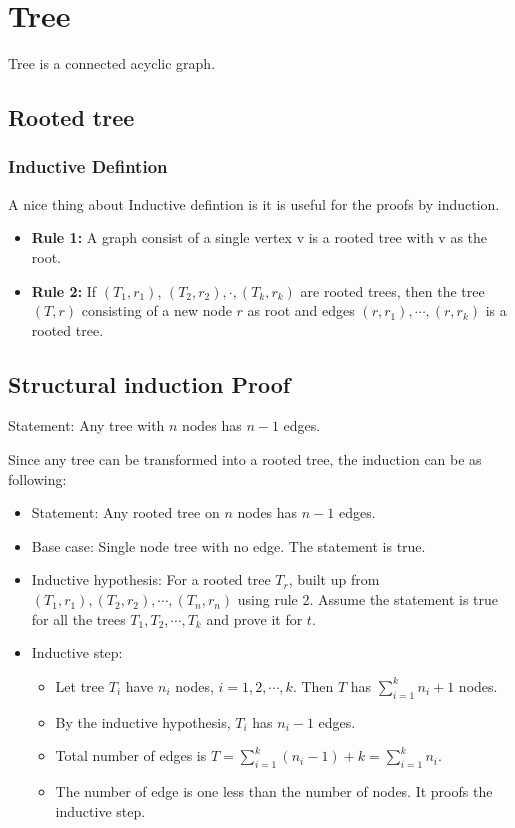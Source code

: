 \documentclass[en,hazy,blue,screen,14pt]{elegantnote}
\begin{document}
\section{Tree}
Tree is a connected acyclic graph.
\subsection{Rooted tree}
\subsubsection{Inductive Defintion}
A nice thing about Inductive defintion is it is useful for the proofs by 
induction.
\begin{itemize}
 \item \textbf{Rule 1:} A graph consist of a single vertex v is a rooted tree 
with v as the root.
 \item \textbf{Rule 2:} If $(T_1, r_1)$, $(T_2, r_2), \cdot, (T_k, r_k)$ are 
rooted trees, then the tree $(T, r)$ consisting of a new node $r$ as root and 
edges $(r, r_1), \cdots, (r, r_k)$ is a rooted tree.
\end{itemize}
\subsection{Structural induction Proof}
Statement: Any tree with $n$ nodes has $n-1$ edges.

Since any tree can be transformed into a rooted tree, the induction can be as 
following:
\begin{itemize}
 \item Statement: Any rooted tree on $n$ nodes has $n-1$ edges.
 \item Base case: Single node tree with no edge. The statement is true.
 \item Inductive hypothesis: For a rooted tree $T_r$, built up from $(T_1, 
r_1), (T_2, r_2), \cdots, (T_n, r_n)$ using rule 2. Assume the statement is 
true for all the trees $T_1, T_2, \cdots, T_k$ and prove it for $t$.
\item Inductive step:
    \begin{itemize}
    \item Let tree $T_i$ have $n_i$ nodes, $i = 1, 2, \cdots, k$. Then $T$ has 
    $\sum_{i=1}^k n_i + 1$ nodes.
    \item By the inductive hypothesis, $T_i$ has $n_i - 1$ edges.
    \item Total number of edges is $T = \sum_{i=1}^k (n_i - 1) + k = 
\sum_{i=1}^k 
    n_i$.
    \item The number of edge is one less than the number of nodes. It proofs 
the     inductive step.
    \end{itemize}
 \end{itemize}
\end{document}
